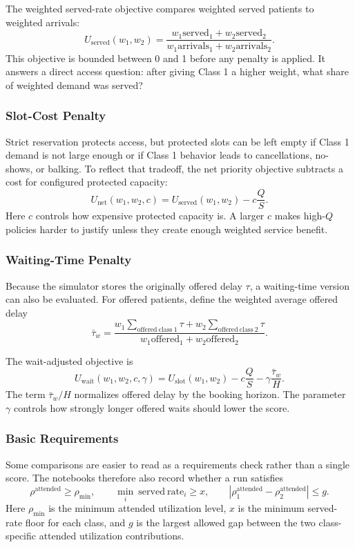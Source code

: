 \documentclass[11pt]{article}
\begin{document}
The weighted served-rate objective compares weighted served patients to weighted arrivals:
\[
U_{\mathrm{served}}(w_1,w_2)
=
\frac{
w_1\mathrm{served}_1+w_2\mathrm{served}_2
}{
w_1\mathrm{arrivals}_1+w_2\mathrm{arrivals}_2
}.
\]
This objective is bounded between 0 and 1 before any penalty is applied. It answers a direct
access question: after giving Class 1 a higher weight, what share of weighted demand was served?

\subsubsection{Slot-Cost Penalty}

Strict reservation protects access, but protected slots can be left empty if Class 1 demand is not
large enough or if Class 1 behavior leads to cancellations, no-shows, or balking. To reflect that
tradeoff, the net priority objective subtracts a cost for configured protected capacity:
\[
U_{\mathrm{net}}(w_1,w_2,c)
=
U_{\mathrm{served}}(w_1,w_2)
-
c\frac{Q}{S}.
\]
Here \(c\) controls how expensive protected capacity is. A larger \(c\) makes high-\(Q\) policies
harder to justify unless they create enough weighted service benefit.

\subsubsection{Waiting-Time Penalty}

Because the simulator stores the originally offered delay \(\tau\), a waiting-time version can also
be evaluated. For offered patients, define the weighted average offered delay
\[
\bar{\tau}_w
=
\frac{
w_1\sum_{\mathrm{offered\ class\ 1}}\tau
+
w_2\sum_{\mathrm{offered\ class\ 2}}\tau
}{
w_1\mathrm{offered}_1+w_2\mathrm{offered}_2
}.
\]

The wait-adjusted objective is
\[
U_{\mathrm{wait}}(w_1,w_2,c,\gamma)
=
U_{\mathrm{slot}}(w_1,w_2)
-
c\frac{Q}{S}
-
\gamma\frac{\bar{\tau}_w}{H}.
\]
The term \(\bar{\tau}_w/H\) normalizes offered delay by the booking horizon. The parameter
\(\gamma\) controls how strongly longer offered waits should lower the score.

\subsubsection{Basic Requirements}

Some comparisons are easier to read as a requirements check rather than a single score. The
notebooks therefore also record whether a run satisfies
\[
\rho^{\mathrm{attended}}\ge \rho_{\min},
\qquad
\min_i\ \mathrm{served\ rate}_i\ge x,
\qquad
\left|\rho_1^{\mathrm{attended}}-\rho_2^{\mathrm{attended}}\right|\le g.
\]
Here \(\rho_{\min}\) is the minimum attended utilization level, \(x\) is the minimum served-rate
floor for each class, and \(g\) is the largest allowed gap between the two class-specific attended
utilization contributions.
\end{document}
